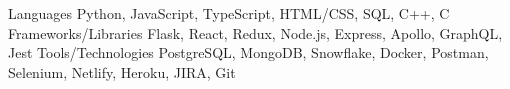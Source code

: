 
\begin{cvskills}
  \cvskill
    {Languages} %
    {Python, JavaScript, TypeScript, HTML/CSS, SQL, C++, C} %
  \cvskill
    {Frameworks/Libraries} %
    {Flask, React, Redux, Node.js, Express, Apollo, GraphQL, Jest} %
  \cvskill
    {Tools/Technologies} %
    {PostgreSQL, MongoDB, Snowflake, Docker, Postman, Selenium, Netlify, Heroku, JIRA, Git} %
\end{cvskills}

